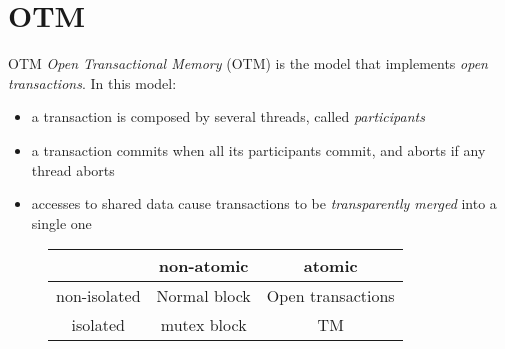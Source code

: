 \documentclass[beamer={noamsthm,10pt},target=bach]{thud}[2014/03/11]
\begin{document}






\section{OTM}

\begin{frame}{OTM}
\emph{Open Transactional Memory} (OTM) is the model that implements \emph{open transactions}. In this model:%
\begin{itemize}
\item%
a transaction is composed by several threads, called \emph{participants}
\item%
a transaction commits when all its participants commit, and aborts if any thread aborts
\item%
accesses to shared data cause transactions to be \emph{transparently merged} into a single one
\end{itemize}

\begin{figure}
\centering
\begin{tabular}{ c | c | c |}
\cline{2-3}
& non-atomic & atomic \\
\hline
\multicolumn{1}{|c|}{non-isolated} & Normal block & Open transactions\\
\hline
\multicolumn{1}{|c|}{isolated} & mutex block & TM\\
\hline
\end{tabular}
\end{figure}
\end{frame}
\end{document}
